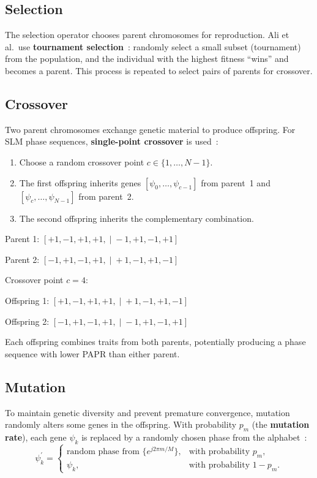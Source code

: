 \subsection{Selection}

The selection operator chooses parent chromosomes for reproduction.
Ali et al.\ use \textbf{tournament selection}~\cite{ali2016new}:
randomly select a small subset (tournament) from the population,
and the individual with the highest fitness ``wins'' and becomes a parent.
This process is repeated to select pairs of parents for crossover.

\subsection{Crossover}

Two parent chromosomes exchange genetic material to produce offspring.
For SLM phase sequences, \textbf{single-point crossover} is
used~\cite{ali2016new}:
\begin{enumerate}
    \item Choose a random crossover point $c \in \{1, \dots, N-1\}$.
    \item The first offspring inherits genes $[\psi_0, \dots, \psi_{c-1}]$
          from parent~1 and $[\psi_c, \dots, \psi_{N-1}]$ from parent~2.
    \item The second offspring inherits the complementary combination.
\end{enumerate}

\begin{workingexample}[Crossover with $N=8$]
    Parent 1: $[+1, -1, +1, +1, \;|\; -1, +1, -1, +1]$

    Parent 2: $[-1, +1, -1, +1, \;|\; +1, -1, +1, -1]$

    Crossover point $c = 4$:

    Offspring 1: $[+1, -1, +1, +1, \;|\; +1, -1, +1, -1]$

    Offspring 2: $[-1, +1, -1, +1, \;|\; -1, +1, -1, +1]$

    Each offspring combines traits from both parents, potentially
    producing a phase sequence with lower PAPR than either parent.
\end{workingexample}

\subsection{Mutation}

To maintain genetic diversity and prevent premature convergence,
mutation randomly alters some genes in the offspring.  With probability
$p_m$ (the \textbf{mutation rate}), each gene $\psi_k$ is replaced by a
randomly chosen phase from the alphabet~\cite{ali2016new}:
\begin{equation}
    \psi_k^{\prime} =
    \begin{cases}
        \text{random phase from } \{e^{j2\pi m/M}\}, & \text{with probability } p_m, \\
        \psi_k, & \text{with probability } 1 - p_m.
    \end{cases}
    \label{eq:gaslm_mutation}
\end{equation}

